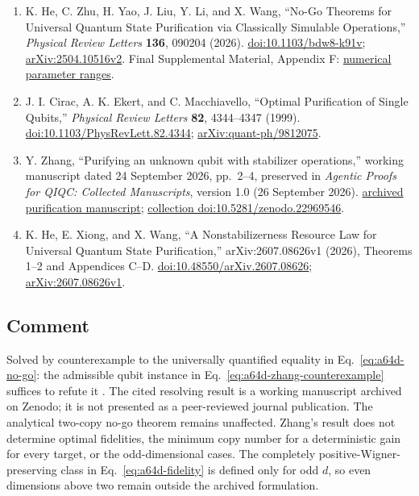 \begin{enumerate}[label={},leftmargin=4.8em,labelsep=0.5em]
  \footnotesize
  \item[\textup{[HZY+26]}]\label{ref:a64d-he-et-al}
  K. He, C. Zhu, H. Yao, J. Liu, Y. Li, and X. Wang, ``No-Go Theorems for
  Universal Quantum State Purification via Classically Simulable
  Operations,'' \emph{Physical Review Letters} \textbf{136}, 090204 (2026).
  \href{https://doi.org/10.1103/bdw8-k91v}{doi:10.1103/bdw8-k91v};
  \href{https://arxiv.org/abs/2504.10516v2}{arXiv:2504.10516v2}.
  Final Supplemental Material, Appendix F:
  \href{https://journals.aps.org/prl/supplemental/10.1103/bdw8-k91v/Supplemental-Material_.pdf}{numerical parameter ranges}.

  \item[\textup{[CEM99]}]\label{ref:a64d-cirac-ekert-macchiavello}
  J. I. Cirac, A. K. Ekert, and C. Macchiavello, ``Optimal Purification of
  Single Qubits,'' \emph{Physical Review Letters} \textbf{82}, 4344--4347
  (1999).
  \href{https://doi.org/10.1103/PhysRevLett.82.4344}{doi:10.1103/PhysRevLett.82.4344};
  \href{https://arxiv.org/abs/quant-ph/9812075}{arXiv:quant-ph/9812075}.

  \item[\textup{[Zha26]}]\label{ref:a64d-zhang-counterexample}
  Y. Zhang, ``Purifying an unknown qubit with stabilizer operations,''
  working manuscript dated 24 September 2026, pp.~2--4, preserved in
  \emph{Agentic Proofs for QIQC: Collected Manuscripts}, version 1.0
  (26 September 2026).
  \href{https://zenodo.org/records/22969546/files/stabilizer-purification.pdf}{archived purification manuscript};
  \href{https://doi.org/10.5281/zenodo.22969546}{collection doi:10.5281/zenodo.22969546}.

  \item[\textup{[HXW26]}]\label{ref:a64d-resource-law}
  K. He, E. Xiong, and X. Wang, ``A Nonstabilizerness Resource Law for Universal Quantum State Purification,'' arXiv:2607.08626v1 (2026), Theorems 1--2 and Appendices C--D. \href{https://doi.org/10.48550/arXiv.2607.08626}{doi:10.48550/arXiv.2607.08626}; \href{https://arxiv.org/abs/2607.08626v1}{arXiv:2607.08626v1}.
\end{enumerate}

\subsection*{Comment}

Solved by counterexample to the universally quantified equality
in Eq.~\eqref{eq:a64d-no-go}: the admissible qubit instance in
Eq.~\eqref{eq:a64d-zhang-counterexample} suffices to refute it
.
The cited resolving result is a working manuscript archived on Zenodo;
it is not presented as a peer-reviewed journal publication. The
analytical two-copy no-go theorem remains unaffected. Zhang's result
does not determine optimal fidelities, the minimum copy number for a
deterministic gain for every target, or the odd-dimensional cases.
The completely positive-Wigner-preserving class in
Eq.~\eqref{eq:a64d-fidelity} is defined only for odd $d$, so even
dimensions above two remain outside the archived formulation.


